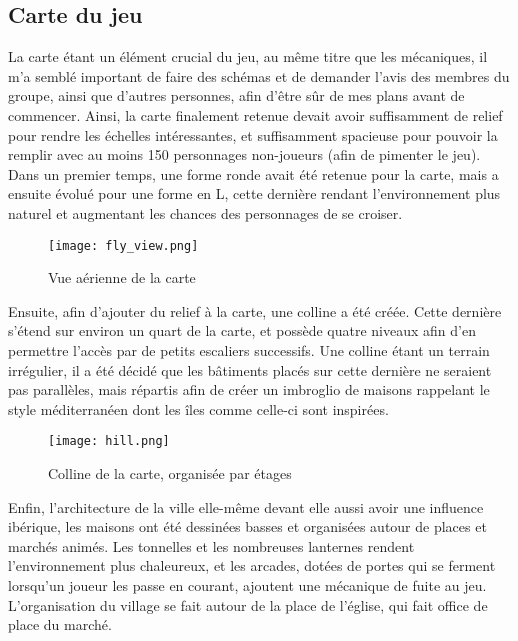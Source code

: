 \subsection{Carte du jeu}

La carte étant un élément crucial du jeu, au même titre que les mécaniques, 
il m’a semblé important de faire des schémas et de demander l’avis des membres 
du groupe, ainsi que d’autres personnes, afin d’être sûr de mes plans avant de 
commencer. Ainsi, la carte finalement retenue devait avoir suffisamment de 
relief pour rendre les échelles intéressantes, et suffisamment spacieuse pour 
pouvoir la remplir avec au moins 150 personnages non-joueurs (afin de pimenter le jeu).
Dans un premier temps, une forme ronde avait été retenue pour la carte, mais 
a ensuite évolué pour une forme en L, cette dernière rendant l’environnement 
plus naturel et augmentant les chances des personnages de se croiser.


\begin{figure}[hbt!]
    \centering
    \texttt{[image: fly\_view.png]}
    \caption{Vue aérienne de la carte}
\end{figure}

Ensuite, afin d’ajouter du relief à la carte, une colline a été créée. 
Cette dernière s’étend sur environ un quart de la carte, et possède quatre 
niveaux afin d’en permettre l’accès par de petits escaliers successifs. 
Une colline étant un terrain irrégulier, il a été décidé que les bâtiments 
placés sur cette dernière ne seraient pas parallèles, mais répartis afin de 
créer un imbroglio de maisons rappelant le style méditerranéen dont les îles 
comme celle-ci sont inspirées.


\begin{figure}[hbt!]
    \centering
    \texttt{[image: hill.png]}
    \caption{Colline de la carte, organisée par étages}
\end{figure}


Enfin, l’architecture de la ville elle-même devant elle aussi avoir une influence 
ibérique, les maisons ont été dessinées basses et organisées autour de places et 
marchés animés. Les tonnelles et les nombreuses lanternes rendent l’environnement 
plus chaleureux, et les arcades, dotées de portes qui se ferment lorsqu’un joueur 
les passe en courant, ajoutent une mécanique de fuite au jeu. L’organisation du 
village se fait autour de la place de l’église, qui fait office de place du marché.\\


